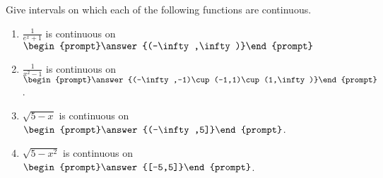 \documentclass{ximera}
\author{Gregory Hartman \and Matthew Carr}
\begin{document}
\begin{exercise}




Give intervals on which each of the following functions are continuous.

\begin{enumerate}
\item		$\frac{1}{e^x+1}$ is continuous on $\begin{prompt}\answer{(-\infty,\infty)}\end{prompt}$
\item		$\frac{1}{x^2-1}$ is continuous on $\begin{prompt}\answer{(-\infty,-1)\cup(-1,1)\cup(1,\infty)}\end{prompt}$.
\item		$\sqrt{5-x}$ is continuous on $\begin{prompt}\answer{(-\infty,5]}\end{prompt}$.
\item		$\sqrt{5-x^2}$ is continuous on $\begin{prompt}\answer{[-5,5]}\end{prompt}$.
\end{enumerate}

\end{exercise}
\end{document}
